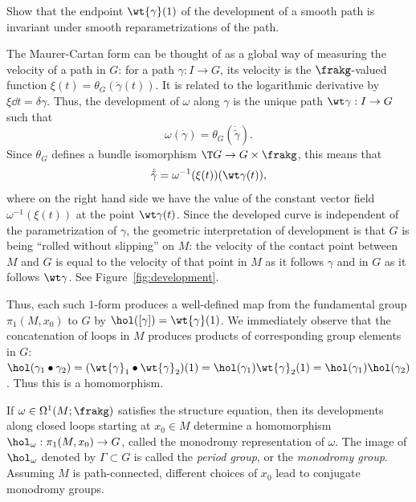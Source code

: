 \begin{xca}
    Show that the endpoint $\wt{\gamma}(1)$ of the development of a smooth path is invariant under smooth reparametrizations of the path.
\end{xca}

\begin{rem}
    The Maurer-Cartan form can be thought of as a global way of measuring the velocity of a path in $G$: for a path $\gamma:I\to G$, its velocity is the $\frakg$-valued function $\xi(t)=\theta_G(\dot\gamma(t))$. It is related to the logarithmic derivative by $\xi\dd t=\delta\gamma$. Thus, the development of $\omega$ along $\gamma$ is the unique path $\wt\gamma:I\to G$ such that 
    \[\omega(\dot\gamma)=\theta_G(\dot{\tilde\gamma}).\]
    Since $\theta_G$ defines a bundle isomorphism $\T G\to G\times\frakg$, this means that 
    \[\dot{\tilde\gamma}=\omega^{-1}(\xi(t))(\wt\gamma(t)),\]
    where on the right hand side we have the value of the constant vector field $\omega^{-1}(\xi(t))$ at the point $\wt\gamma(t)$. Since the developed curve is independent of the parametrization of $\gamma$, the geometric interpretation of development is that $G$ is being ``rolled without slipping'' on $M$: the velocity of the contact point between $M$ and $G$ is equal to the velocity of that point in $M$ as it follows $\gamma$ and in $G$ as it follows $\wt\gamma$. See Figure~\ref{fig:development}.
\end{rem}

Thus, each such $1$-form produces a well-defined map from the fundamental group $\pi_1(M,x_0)$ to $G$ by $\hol([\gamma])=\wt{\gamma}(1)$. We immediately observe that the concatenation of loops in $M$ produces products of corresponding group elements in $G$: $\hol(\gamma_1\bullet \gamma_2)=(\wt{\gamma}_1\bullet\wt{\gamma}_2)(1)=\hol(\gamma_1)\wt{\gamma}_2(1)=\hol(\gamma_1)\hol(\gamma_2)$. Thus this is a homomorphism.

\begin{defn}
    If $\omega\in\Omega^1(M;\frakg)$ satisfies the structure equation, then its developments along closed loops starting at $x_0\in M$ determine a homomorphism $\hol_\omega:\pi_1(M,x_0)\to G$, called the monodromy representation of $\omega$. The image of $\hol_\omega$ denoted by $\varGamma\subset G$ is called the \emph{period group}, or the \emph{monodromy group}. Assuming $M$ is path-connected, different choices of $x_0$ lead to conjugate monodromy groups.
\end{defn}

